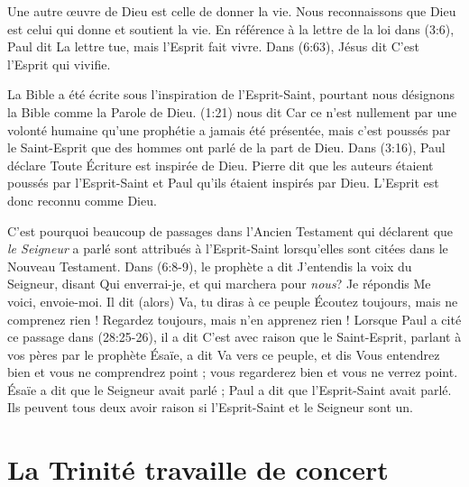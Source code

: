 Une autre œuvre de Dieu est celle de donner la vie. Nous reconnaissons que Dieu
 est celui qui donne et soutient la vie.
 En référence à la lettre de la loi dans (3:6),
 Paul dit\frcolon{} \Og La lettre tue, mais l'Esprit fait vivre. \Fg{}
 Dans (6:63), Jésus dit\frcolon{} \Og C'est l'Esprit qui vivifie.\Fg{}

La Bible a été écrite sous l'inspiration de l'Esprit-Saint, pourtant nous
 désignons la Bible comme la Parole de Dieu.
 (1:21) nous dit\frcolon{}
 \Og Car ce n'est nullement par une volonté humaine qu'une prophétie a jamais
 été présentée, mais c'est poussés par le Saint-Esprit que des hommes ont parlé
 de la part de Dieu. \Fg{}
 Dans (3:16), Paul déclare\frcolon{}
 \Og Toute Écriture est inspirée de Dieu. \Fg{}
 Pierre dit que les auteurs étaient poussés par l'Esprit-Saint et Paul qu'ils
 étaient inspirés par Dieu. L'Esprit est donc reconnu comme Dieu.

C'est pourquoi beaucoup de passages dans l'Ancien Testament qui déclarent que
 \emph{le Seigneur} a parlé sont attribués à l'Esprit-Saint lors\-qu'elles
 sont citées dans le Nouveau Testament.
 Dans (6:8-9), le prophète a dit\frcolon{} \Og J'entendis la voix du
 Seigneur, disant\frcolon{} Qui enverrai-je, et qui marchera pour \emph{nous}? Je répondis\frcolon{}
 Me voici, envoie-moi. Il dit (alors)\frcolon{} Va, tu diras à ce peuple\frcolon{}
 Écoutez toujours, mais ne comprenez rien ! Regardez toujours, mais n'en
 apprenez rien ! \Fg{}
 Lorsque Paul a cité ce passage dans (28:25-26), il a dit\frcolon{}
 \Og C'est avec raison que le Saint-Esprit, parlant à vos pères par le
 prophète Ésaïe, a dit\frcolon{} Va vers ce peuple, et dis\frcolon{} Vous entendrez bien et
 vous ne comprendrez point ; vous regarderez bien et vous ne verrez point. \Fg{}
 Ésaïe a dit que le Seigneur avait parlé ; Paul a dit que l'Esprit-Saint
 avait parlé.
 Ils peuvent tous deux avoir raison si l'Esprit-Saint et le Seigneur sont un.


\section{La Trinit\'e travaille de concert}

